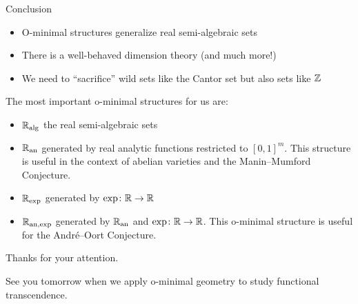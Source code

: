 \documentclass{beamer}
\begin{document}
\begin{frame}{Conclusion}
  \begin{itemize}
  \item O-minimal structures generalize real semi-algebraic sets
  \item There is a well-behaved dimension theory (and much more!)
  \item We need to  ``sacrifice'' wild sets like the Cantor set
    but also sets like ${\mathbb{Z}}$ 
  \end{itemize}
  
  The most important o-minimal structures for us are:
  
  \begin{itemize}
  \item ${\mathbb{R}}_{\mathrm{alg}}$ the real semi-algebraic sets
  \item ${{\mathbb{R}}_{\mathrm{an}}}$ generated by real analytic functions restricted to
    $[0,1]^m$. This structure is useful in the context of abelian
    varieties and the Manin--Mumford Conjecture.
  \item ${{\mathbb{R}}_{\mathrm{exp}}}$ generated by $\exp \colon {\mathbb{R}}\rightarrow{\mathbb{R}}$
  \item ${{\mathbb{R}}_{\mathrm{an,exp}}}$ generated by ${{\mathbb{R}}_{\mathrm{an}}}$ and $\exp \colon
    {\mathbb{R}}\rightarrow{\mathbb{R}}$. This o-minimal structure is useful 
    for the Andr\'e--Oort Conjecture.       
  \end{itemize}  
\end{frame}

\begin{frame}
  \begin{center}
    Thanks for your attention.

    See you tomorrow when we apply o-minimal geometry to study
    functional transcendence.
  \end{center}
\end{frame}
\end{document}
